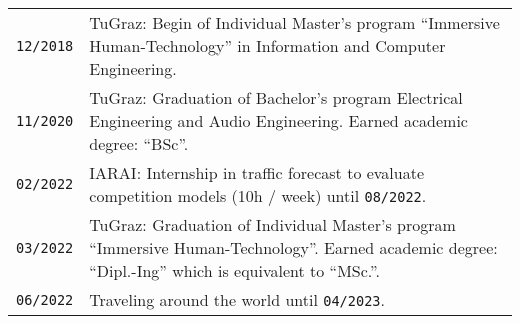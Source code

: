 \begin{tabularx}{\columnwidth}{>{\centering\arraybackslash}p{1.5cm} | p{12cm}}
  \texttt{12/2018} & TuGraz: Begin of Individual Master's program \enquote{Immersive Human-Technology} in Information and Computer Engineering.\\
  \texttt{11/2020} & TuGraz: Graduation of Bachelor's program Electrical Engineering and Audio Engineering. Earned academic degree: \enquote{BSc}.\\
  \texttt{02/2022} & IARAI: Internship in traffic forecast to evaluate competition models (10h / week) until \texttt{08/2022}.\\
  \texttt{03/2022} & TuGraz: Graduation of Individual Master's program \enquote{Immersive Human-Technology}. Earned academic degree: \enquote{Dipl.-Ing} which is equivalent to \enquote{MSc.}.\\
  \texttt{06/2022} & Traveling around the world until \texttt{04/2023}.\\
\end{tabularx}